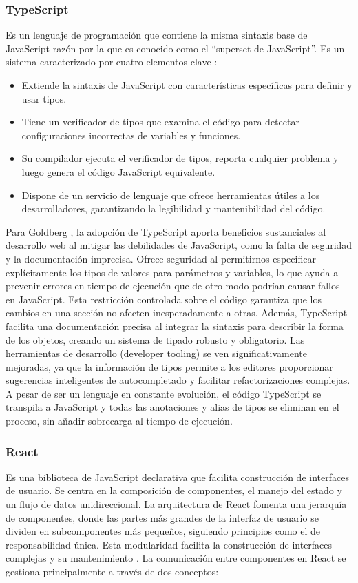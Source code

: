 \subsubsection{TypeScript}
Es un lenguaje de programación que contiene la misma sintaxis base de JavaScript razón por la que es conocido como el ``superset de JavaScript''. Es un sistema caracterizado por cuatro elementos clave \cite{goldberg2022learning}:
\begin{itemize}
    \item Extiende la sintaxis de JavaScript con características específicas para definir y usar tipos.
    \item Tiene un verificador de tipos que examina el código para detectar configuraciones incorrectas de variables y funciones.
    \item Su compilador ejecuta el verificador de tipos, reporta cualquier problema y luego genera el código JavaScript equivalente.
    \item Dispone de un servicio de lenguaje que ofrece herramientas útiles a los desarrolladores, garantizando la legibilidad y mantenibilidad del código.
\end{itemize}

Para Goldberg \cite{goldberg2022learning}, la adopción de TypeScript aporta beneficios sustanciales al desarrollo web al mitigar las debilidades de JavaScript, como la falta de seguridad y la documentación imprecisa. Ofrece seguridad al permitirnos especificar explícitamente los tipos de valores para parámetros y variables, lo que ayuda a prevenir errores en tiempo de ejecución que de otro modo podrían causar fallos en JavaScript. Esta restricción controlada sobre el código garantiza que los cambios en una sección no afecten inesperadamente a otras. Además, TypeScript facilita una documentación precisa al integrar la sintaxis para describir la forma de los objetos, creando un sistema de tipado robusto y obligatorio. Las herramientas de desarrollo (developer tooling) se ven significativamente mejoradas, ya que la información de tipos permite a los editores proporcionar sugerencias inteligentes de autocompletado y facilitar refactorizaciones complejas. A pesar de ser un lenguaje en constante evolución, el código TypeScript se transpila a JavaScript y todas las anotaciones y alias de tipos se eliminan en el proceso, sin añadir sobrecarga al tiempo de ejecución.

\subsubsection{React}
Es una biblioteca de JavaScript declarativa que facilita construcción de interfaces de usuario. Se centra en la composición de componentes, el manejo del estado y un flujo de datos unidireccional. La arquitectura de React fomenta una jerarquía de componentes, donde las partes más grandes de la interfaz de usuario se dividen en subcomponentes más pequeños, siguiendo principios como el de responsabilidad única. Esta modularidad facilita la construcción de interfaces complejas y su mantenimiento \cite{banks2020learning}.
La comunicación entre componentes en React se gestiona principalmente a través de dos conceptos:

